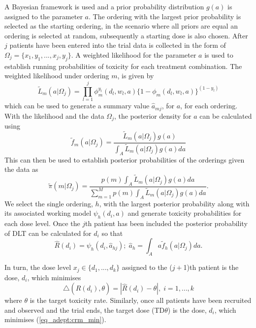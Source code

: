 A Bayesian framework is used and a prior probability distribution $g(a)$ is assigned to the parameter $a$. The ordering with the largest prior probability is selected as the starting ordering, in the scenario where all priors are equal an ordering is selected at random, subsequently a starting dose is also chosen. After $j$ patients have been entered into the trial data is collected in the form of $\Omega_j = \{x_1,y_1, ..., x_j,y_j\}$. A weighted likelihood for the parameter $a$ is used to establish running probabilities of toxicity for each treatment combination. The weighted likelihood under ordering $m$, is given by 
\begin{equation}
\tilde{L}_m(a|\Omega_j)=\prod_{l=1}^{j}\phi_m^{y_l}(d_l,w_l,a)\{1-\phi_m(d_l,w_l,a)\}^{(1-y_l)}
\end{equation} 
which can be used to generate a summary value $\hat{a}_{mj}$, for $a$, for each ordering. With the likelihood and the data $\Omega_j$, the posterior density for $a$ can be calculated using 
\begin{equation}
	\tilde{f}_m(a|\Omega_j)=\frac{\tilde{L}_m(a|\Omega_j)g(a)}{\int_{A}\tilde{L}_m(a|\Omega_j)g(a)da}
\end{equation}
This can then be used to establish posterior probabilities of the orderings given the data as 
\begin{equation}
\tilde{\pi}(m|\Omega_j)=\frac{p(m)\int_{A}\tilde{L}_m(a|\Omega_j)g(a)da}{\sum_{m=1}^{M}p(m)\int_{A}\tilde{L}_m(a|\Omega_j)g(a)da}.
\end{equation}
We select the single ordering, $h$, with the largest posterior probability along with its associated working model $\psi_h(d_i,a)$ and generate toxicity probabilities for each dose level. Once the $j$th patient has been included the posterior probability of DLT can be calculated for $d_{i}$ so that
\begin{equation}
	\hat{R}(d_i) = \psi_h(d_i,\hat{a}_{hj}); \; \hat{a}_h = \int_{A}a\tilde{f}_h(a|\Omega_j)da.
\end{equation}

In turn, the dose level $x_j \in \{d_1,...,d_k\}$ assigned to the ($j+$1)th patient is the dose, $d_i$, which minimises 
\begin{equation}
\label{eq_adept:crm_min}
	\triangle(\hat{R}(d_i),\theta) = |\hat{R}(d_i)-\theta|, \; i=1,...,k
\end{equation}
where $\theta$ is the target toxicity rate. Similarly, once all patients have been recruited and observed and the trial ends, the target dose (TD$\theta$) is the dose, $d_{i}$, which minimises (\ref{eq_adept:crm_min}).


